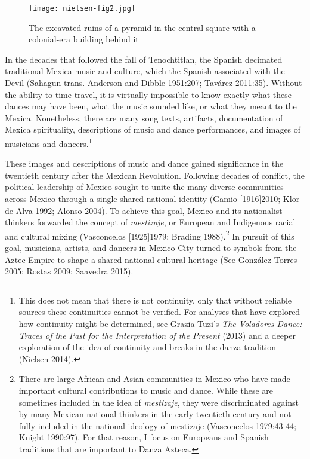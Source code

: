\documentclass{article}
\begin{document}
\begin{figure}
  \texttt{[image: nielsen-fig2.jpg]}
  \caption{The excavated ruins of a pyramid in the central square with a colonial-era building behind it}
\end{figure}

In the decades that followed the fall of Tenochtitlan, the Spanish
decimated traditional Mexica music and culture, which the Spanish
associated with the Devil (Sahagun trans. Anderson and Dibble 1951:207;
Tavárez 2011:35). Without the ability to time travel, it is virtually
impossible to know exactly what these dances may have been, what the
music sounded like, or what they meant to the Mexica. Nonetheless, there
are many song texts, artifacts, documentation of Mexica spirituality,
descriptions of music and dance performances, and images of musicians
and dancers.\footnote{This does not mean that there is not continuity,
  only that without reliable sources these continuities cannot be
  verified. For analyses that have explored how continuity might be
  determined, see Grazia Tuzi's \emph{The Voladores Dance: Traces of the
  Past for the Interpretation of the Present} (2013) and a deeper
  exploration of the idea of continuity and breaks in the danza
  tradition (Nielsen 2014).}

These images and descriptions of music and dance gained significance in
the twentieth century after the Mexican Revolution. Following decades of
conflict, the political leadership of Mexico sought to unite the many
diverse communities across Mexico through a single shared national
identity (Gamio {[}1916{]}2010; Klor de Alva 1992; Alonso 2004). To
achieve this goal, Mexico and its nationalist thinkers forwarded the
concept of \emph{mestizaje}, or European and Indigenous racial and
cultural mixing (Vasconcelos {[}1925{]}1979; Brading 1988).\footnote{There
  are large African and Asian communities in Mexico who have made
  important cultural contributions to music and dance. While these are
  sometimes included in the idea of \emph{mestizaje}, they were
  discriminated against by many Mexican national thinkers in the early
  twentieth century and not fully included in the national ideology of
  mestizaje (Vasconcelos 1979:43-44; Knight 1990:97). For that reason, I
  focus on Europeans and Spanish traditions that are important to Danza
  Azteca.} In pursuit of this goal, musicians, artists, and dancers in
Mexico City turned to symbols from the Aztec Empire to shape a shared
national cultural heritage (See González Torres 2005; Rostas 2009;
Saavedra 2015).
\end{document}

